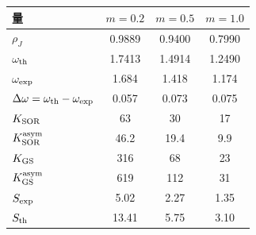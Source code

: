 \begin{tabular}{lccc}
\toprule
量 & $m=0.2$ & $m=0.5$ & $m=1.0$ \\
\midrule
$\rho_J$ & 0.9889 & 0.9400 & 0.7990 \\
$\omega_{\rm th}$ & 1.7413 & 1.4914 & 1.2490 \\
$\omega_{\rm exp}$ & 1.684 & 1.418 & 1.174 \\
$\Delta\omega=\omega_{\rm th}-\omega_{\rm exp}$ & 0.057 & 0.073 & 0.075 \\
$K_{\rm SOR}$ & 63 & 30 & 17 \\
$K_{\rm SOR}^{\rm asym}$ & 46.2 & 19.4 & 9.9 \\
$K_{\rm GS}$ & 316 & 68 & 23 \\
$K_{\rm GS}^{\rm asym}$ & 619 & 112 & 31 \\
$S_{\rm exp}$ & 5.02 & 2.27 & 1.35 \\
$S_{\rm th}$ & 13.41 & 5.75 & 3.10 \\
\bottomrule
\end{tabular}
